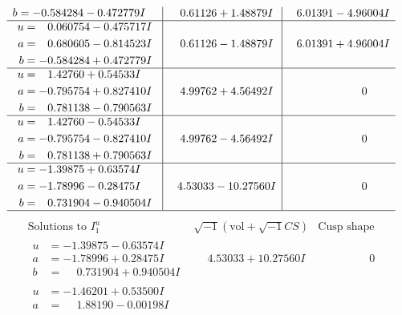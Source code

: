 \documentclass[1p]{elsarticle_modified}
\theoremstyle{definition}
\newcommand{\I}{\sqrt{-1}}
\begin{document}
$$\begin{array}{c|c|c}
\begin{aligned}
b &= -0.584284 - 0.472779 I\end{aligned}
 & \phantom{-}0.61126 + 1.48879 I & \phantom{-}6.01391 - 4.96004 I \\ \hline\begin{aligned}
u &= \phantom{-}0.060754 - 0.475717 I \\
a &= \phantom{-}0.680605 - 0.814523 I \\
b &= -0.584284 + 0.472779 I\end{aligned}
 & \phantom{-}0.61126 - 1.48879 I & \phantom{-}6.01391 + 4.96004 I \\ \hline\begin{aligned}
u &= \phantom{-}1.42760 + 0.54533 I \\
a &= -0.795754 + 0.827410 I \\
b &= \phantom{-}0.781138 - 0.790563 I\end{aligned}
 & \phantom{-}4.99762 + 4.56492 I & \phantom{-0.000000 } 0 \\ \hline\begin{aligned}
u &= \phantom{-}1.42760 - 0.54533 I \\
a &= -0.795754 - 0.827410 I \\
b &= \phantom{-}0.781138 + 0.790563 I\end{aligned}
 & \phantom{-}4.99762 - 4.56492 I & \phantom{-0.000000 } 0 \\ \hline\begin{aligned}
u &= -1.39875 + 0.63574 I \\
a &= -1.78996 - 0.28475 I \\
b &= \phantom{-}0.731904 - 0.940504 I\end{aligned}
 & \phantom{-}4.53033 - 10.27560 I & \phantom{-0.000000 } 0\\
 \hline 
 \end{array}$$\newpage$$\begin{array}{c|c|c}  
\text{Solutions to }I^u_{1}& \I (\text{vol} + \sqrt{-1}CS) & \text{Cusp shape}\\
 \hline 
\begin{aligned}
u &= -1.39875 - 0.63574 I \\
a &= -1.78996 + 0.28475 I \\
b &= \phantom{-}0.731904 + 0.940504 I\end{aligned}
 & \phantom{-}4.53033 + 10.27560 I & \phantom{-0.000000 } 0 \\ \hline\begin{aligned}
u &= -1.46201 + 0.53500 I \\
a &= \phantom{-}1.88190 - 0.00198 I \\

\end{aligned}
\end{array}$$
\end{document}
